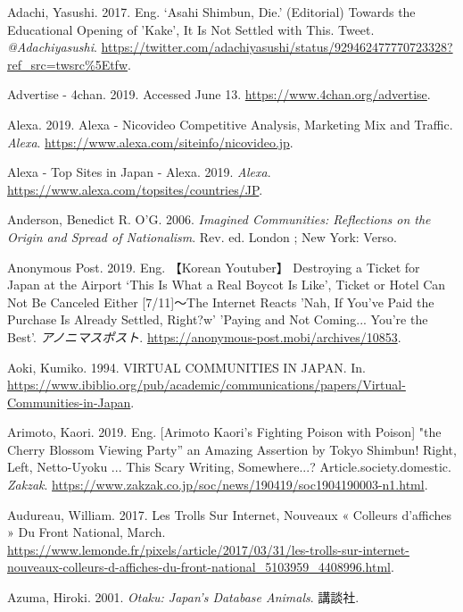 \documentclass[10pt,british,A4paper,,openany]{memoir}
\begin{document}
\hypertarget{ref-adachi_eng._2017}{}
Adachi, Yasushi. 2017. Eng. `Asahi Shimbun, Die.' (Editorial) Towards
the Educational Opening of 'Kake', It Is Not Settled with This. Tweet.
\emph{@Adachiyasushi}.
\url{https://twitter.com/adachiyasushi/status/929462477770723328?ref_src=twsrc\%5Etfw}.

\hypertarget{ref-noauthor_advertise_nodate}{}
Advertise - 4chan. 2019. Accessed June 13.
\url{https://www.4chan.org/advertise}.

\hypertarget{ref-alexa_alexa_2019}{}
Alexa. 2019. Alexa - Nicovideo Competitive Analysis, Marketing Mix and
Traffic. \emph{Alexa}.
\url{https://www.alexa.com/siteinfo/nicovideo.jp}.

\hypertarget{ref-noauthor_alexa_2019}{}
Alexa - Top Sites in Japan - Alexa. 2019. \emph{Alexa}.
\url{https://www.alexa.com/topsites/countries/JP}.

\hypertarget{ref-anderson_imagined_2006}{}
Anderson, Benedict R. O'G. 2006. \emph{Imagined Communities: Reflections
on the Origin and Spread of Nationalism}. Rev. ed. London ; New York:
Verso.

\hypertarget{ref-anonymous_post_eng._2019}{}
Anonymous Post. 2019. Eng. 【Korean Youtuber】 Destroying a Ticket for
Japan at the Airport `This Is What a Real Boycot Is Like', Ticket or
Hotel Can Not Be Canceled Either {[}7/11{]}～The Internet Reacts 'Nah,
If You've Paid the Purchase Is Already Settled, Right?w' 'Paying and Not
Coming... You're the Best'. \emph{アノニマスポスト}.
\url{https://anonymous-post.mobi/archives/10853}.

\hypertarget{ref-aoki_virtual_1994}{}
Aoki, Kumiko. 1994. VIRTUAL COMMUNITIES IN JAPAN. In.
\url{https://www.ibiblio.org/pub/academic/communications/papers/Virtual-Communities-in-Japan}.

\hypertarget{ref-arimoto_eng._2019}{}
Arimoto, Kaori. 2019. Eng. {[}Arimoto Kaori's Fighting Poison with
Poison{]} "the Cherry Blossom Viewing Party'' an Amazing Assertion by
Tokyo Shimbun! Right, Left, Netto-Uyoku ... This Scary Writing,
Somewhere...? Article.society.domestic. \emph{Zakzak}.
\url{https://www.zakzak.co.jp/soc/news/190419/soc1904190003-n1.html}.

\hypertarget{ref-audureau_les_2017}{}
Audureau, William. 2017. Les Trolls Sur Internet, Nouveaux « Colleurs
d'affiches » Du Front National, March.
\url{https://www.lemonde.fr/pixels/article/2017/03/31/les-trolls-sur-internet-nouveaux-colleurs-d-affiches-du-front-national_5103959_4408996.html}.

\hypertarget{ref-azuma_otaku:_2001}{}
Azuma, Hiroki. 2001. \emph{Otaku: Japan's Database Animals}. 講談社.
\end{document}
